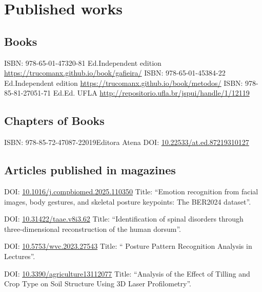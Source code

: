 \documentclass[11pt,a4paper,sans]{moderncv} %
\newcommand{\doiurl}[1]{\href{https://doi.org/#1}{#1}}
\begin{document}
\section{Published works}
\subsection{Books}
	      {ISBN: 978-65-01-47320-8}{1 Ed.}{Independent edition}
	      {\url{https://trucomanx.github.io/book/gafieira/}}
	      {ISBN: 978-65-01-45384-2}{2 Ed.}{Independent edition}
	      {\url{https://trucomanx.github.io/book/metodos/}}
	      {ISBN: 978-85-81-27051-7}{1 Ed.}{Ed. UFLA}
	      {\url{http://repositorio.ufla.br/jspui/handle/1/12119}}

\subsection{Chapters of Books}
	      {ISBN: 978-85-72-47087-2}{2019}{Editora Atena}
	      {DOI: \doiurl{10.22533/at.ed.87219310127}}

\subsection{Articles published in magazines}

	      {DOI: \doiurl{10.1016/j.compbiomed.2025.110350} }{}{}
	      {Title: ``Emotion recognition from facial images, body gestures, and skeletal posture keypoints: The BER2024 dataset''.}
	      
	      {DOI: \doiurl{10.31422/taae.v8i3.62} }{}{}
	      {Title: ``Identification of spinal disorders through three-dimensional reconstruction of the human dorsum''.}
	      
	      {DOI: \doiurl{10.5753/wvc.2023.27543} }{}{}
	      {Title: `` Posture Pattern Recognition Analysis in Lectures''.}
	      
	      {DOI: \doiurl{10.3390/agriculture13112077} }{}{}
	      {Title: ``Analysis of the Effect of Tilling and Crop Type on Soil Structure Using 3D Laser Profilometry''.}
	      
\end{document}
